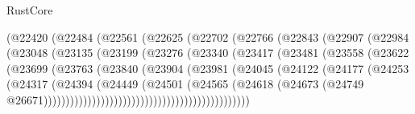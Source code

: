 \begin{lexlean}{RustCore}
\begin{coremodule}
                            (@22420
                              (@22484
                                (@22561
                                  (@22625
                                    (@22702
                                      (@22766
                                        (@22843
                                          (@22907
                                            (@22984
                                              (@23048
                                                (@23135
                                                  (@23199
                                                    (@23276
                                                      (@23340
                                                        (@23417
                                                          (@23481
                                                            (@23558
                                                              (@23622
                                                                (@23699
                                                                  (@23763
                                                                    (@23840
                                                                      (@23904
                                                                        (@23981
                                                                          (@24045
                                                                            (@24122
                                                                              (@24177
                                                                                (@24253
                                                                                  (@24317
                                                                                    (@24394
                                                                                      (@24449
                                                                                        (@24501
                                                                                          (@24565
                                                                                            (@24618
                                                                                              (@24673
                                                                                                (@24749
                                                                                                  @26671)))))))))))))))))))))))))))))))))))))))))))))))

\end{coremodule}
\end{lexlean}
